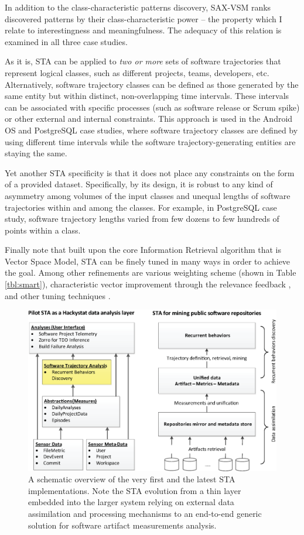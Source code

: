 In addition to the class-characteristic patterns discovery, SAX-VSM ranks discovered patterns by their class-characteristic power -- the property which I relate to interestingness and meaningfulness. The adequacy of this relation is examined in all three case studies.

As it is, STA can be applied to \textit{two or more} sets of software trajectories that represent logical classes, such as different projects, teams, developers, etc. Alternatively, software trajectory classes can be defined as those generated by the same entity but within distinct, non-overlapping time intervals. These intervals can be associated with specific processes (such as software release or Scrum spike) or other external and internal constraints. This approach is used in the Android OS and PostgreSQL case studies, where software trajectory classes are defined by using different time intervals while the software trajectory-generating entities are staying the same.

Yet another STA specificity is that it does not place any constraints on the form of a provided dataset. Specifically, by its design, it is robust to any kind of asymmetry among volumes of the input classes and unequal lengths of software trajectories within and among the classes. For example, in PostgreSQL case study, software trajectory lengths varied from few dozens to few hundreds of points within a class.

Finally note that built upon the core Information Retrieval algorithm that is Vector Space Model, STA can be finely tuned in many ways in order to achieve the goal. Among other refinements are various weighting scheme (shown in Table \ref{tbl:smart}), characteristic vector improvement through the relevance feedback \cite{salton-71}, and other tuning techniques \cite{intro_ir_Manning}.

\begin{figure}[t]
   \centering
   \includegraphics[width=145mm]{figures/STA12-schema-draft.eps}
   \caption[A schematic overview of the very first and the latest STA implementations.]
   {A schematic overview of the very first and the latest STA implementations. 
   Note the STA evolution from a thin layer embedded into the larger system relying on external data assimilation and processing 
   mechanisms to an end-to-end generic solution for software artifact measurements analysis.}
   \label{fig:STA12-schema}
\end{figure}

